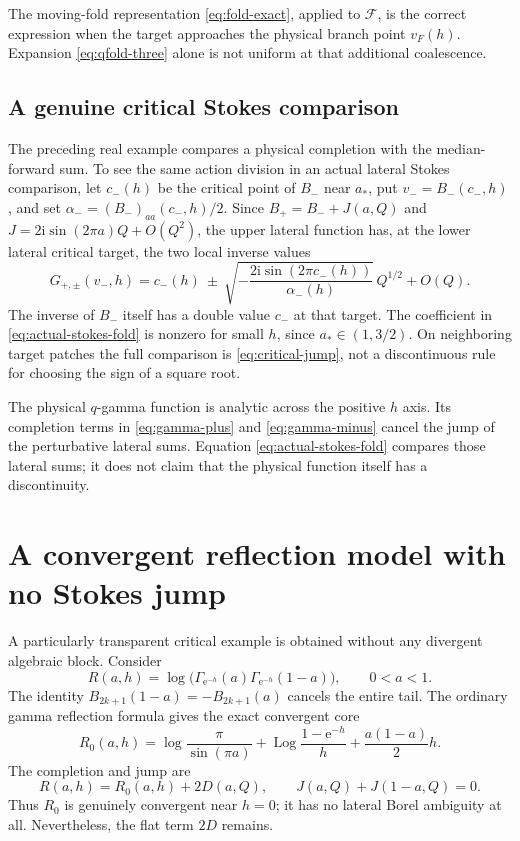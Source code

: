 \documentclass[11pt,a4paper]{article}
\numberwithin{equation}{section}
\theoremstyle{definition}
\theoremstyle{remark}\newtheorem{remark}[theorem]{Remark}
\newcommand{\ii}{\mathrm i}\newcommand{\e}{\mathrm e}
\newcommand{\Log}{\operatorname{Log}}\newcommand{\Li}{\operatorname{Li}}
\begin{document}
The moving-fold representation \eqref{eq:fold-exact}, applied to
$\mathcal F$, is the correct expression when the target approaches the
physical branch point $v_F(h)$. Expansion \eqref{eq:qfold-three} alone
is not uniform at that additional coalescence.

\subsection{A genuine critical Stokes comparison}
The preceding real example compares a physical completion with the
median-forward sum. To see the same action division in an actual
lateral Stokes comparison, let $c_-(h)$ be the critical point of $B_-$
near $a_*$, put $v_-=B_-(c_-,h)$, and set
$\alpha_-=(B_-)_{aa}(c_-,h)/2$. Since
$B_+=B_-+J(a,Q)$ and
$J=2\ii\sin(2\pi a)Q+O(Q^2)$, the upper lateral function has, at the
lower lateral critical target, the two local inverse values
\begin{equation}\label{eq:actual-stokes-fold}
 G_{+,\pm}(v_-,h)=c_-(h)\ \pm\
 \sqrt{-\frac{2\ii\sin(2\pi c_-(h))}{\alpha_-(h)}}\,
 Q^{1/2}+O(Q).
\end{equation}
The inverse of $B_-$ itself has a double value $c_-$ at that target.
The coefficient in \eqref{eq:actual-stokes-fold} is nonzero for small
$h$, since $a_*\in(1,3/2)$. On neighboring target patches the full
comparison is \eqref{eq:critical-jump}, not a discontinuous rule for
choosing the sign of a square root.

The physical $q$-gamma function is analytic across the positive $h$
axis. Its completion terms in \eqref{eq:gamma-plus} and
\eqref{eq:gamma-minus} cancel the jump of the perturbative lateral sums.
Equation \eqref{eq:actual-stokes-fold} compares those lateral sums; it
does not claim that the physical function itself has a discontinuity.

\section{A convergent reflection model with no Stokes jump}
\label{sec:reflection}

A particularly transparent critical example is obtained without any
divergent algebraic block. Consider
\begin{equation}\label{eq:reflection-def}
 R(a,h)=\log\bigl(\Gamma_{\e^{-h}}(a)
                         \Gamma_{\e^{-h}}(1-a)\bigr),\qquad 0<a<1.
\end{equation}
The identity $B_{2k+1}(1-a)=-B_{2k+1}(a)$ cancels the entire tail.
The ordinary gamma reflection formula \cite{dlmfgamma} gives the exact convergent core
\begin{equation}\label{eq:reflection-core}
 R_0(a,h)=\log\frac{\pi}{\sin(\pi a)}
       +\Log\frac{1-\e^{-h}}h+\frac{a(1-a)}2h.
\end{equation}
The completion and jump are
\begin{equation}\label{eq:reflection-completion}
 R(a,h)=R_0(a,h)+2D(a,Q),\qquad
 J(a,Q)+J(1-a,Q)=0.
\end{equation}
Thus $R_0$ is genuinely convergent near $h=0$; it has no lateral Borel
ambiguity at all. Nevertheless, the flat term $2D$ remains.
\end{document}

